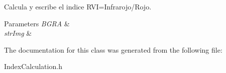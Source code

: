 Calcula y escribe el indice R\+VI=Infrarojo/\+Rojo. 


\begin{DoxyParams}{Parameters}
{\em B\+G\+RA} & \\
\hline
{\em str\+Img} & \\
\hline
\end{DoxyParams}


The documentation for this class was generated from the following file\+:\begin{DoxyCompactItemize}
\item 
Index\+Calculation.\+h\end{DoxyCompactItemize}
